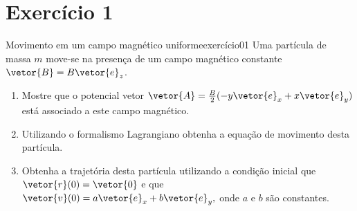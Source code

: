 \section*{Exercício 1}

\begin{exercício}{Movimento em um campo magnético uniforme}{exercício01}
    Uma partícula de massa \(m\) move-se na presença de um campo magnético constante \(\vetor{B} = B \vetor{e}_z\).
    \begin{enumerate}[label=(\alph*)]
        \item Mostre que o potencial vetor \(\vetor{A} = \frac{B}{2}(-y\vetor{e}_x + x \vetor{e}_y)\) está associado a este campo magnético.
        \item Utilizando o formalismo Lagrangiano obtenha a equação de movimento desta partícula.
        \item Obtenha a trajetória desta partícula utilizando a condição inicial que \(\vetor{r}(0) = \vetor{0}\) e que \(\vetor{v}(0) = a\vetor{e}_x + b\vetor{e}_y,\) onde \(a\) e \(b\) são constantes.
    \end{enumerate}
\end{exercício}
